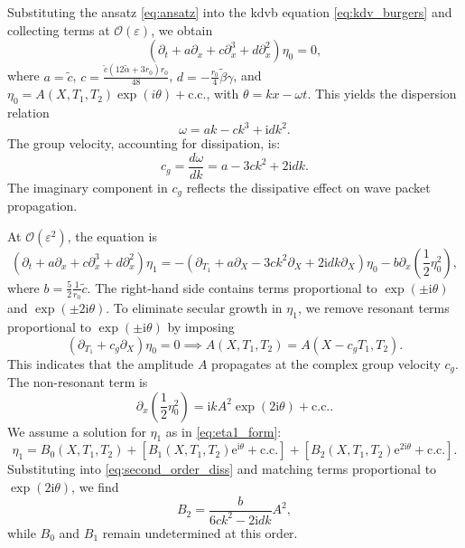 \documentclass[alpha-refs, 12pt]{wiley-article}
\renewcommand{\O}{\mathcal{O}}
\newcommand{\ue}{\mathrm{e}}
\newcommand{\ui}{\mathrm{i}}
\newcommand{\eps}{\varepsilon}
\begin{document}
Substituting the ansatz \eqref{eq:ansatz} into the \acrshort{kdvb} equation \eqref{eq:kdv_burgers} and collecting terms at $\O(\eps)$, we obtain
\begin{equation}\label{eq:leading_order_diss}
  \left( \partial_t + a \partial_x + c \partial_x^3 + d \partial_x^2 \right) \eta_0 = 0,
\end{equation}
where $a = \tilde{c}$, $c = \frac{\tilde{c} (12 \tilde{\alpha} + 3 r_0) r_0}{48}$, $d = -\frac{r_0}{4} \tilde{\beta} \gamma$, and $\eta_0 = A(X, T_1, T_2) \exp(i \theta) + \text{c.c.}$, with $\theta = k x - \omega t$. This yields the dispersion relation
\begin{equation}\label{eq:dispersion_diss}
  \omega = a k - c k^3 + \ui d k^2.
\end{equation}
The group velocity, accounting for dissipation, is:
\begin{equation}\label{eq:group_velocity_diss}
  c_g = \frac{d \omega}{d k} = a - 3 c k^2 + 2 \ui d k.
\end{equation}
The imaginary component in $c_g$ reflects the dissipative effect on wave packet propagation.

At $\O(\eps^2)$, the equation is
\begin{equation}\label{eq:second_order_diss}
  \left( \partial_t + a \partial_x + c \partial_x^3 + d \partial_x^2 \right) \eta_1 = - \left( \partial_{T_1} + a \partial_X - 3 c k^2 \partial_X + 2 \ui d k \partial_X \right) \eta_0 - b \partial_x \left( \frac{1}{2} \eta_0^2 \right),
\end{equation}
where $b = \frac{5}{2} \frac{1}{r_0} \tilde{c}$. The right-hand side contains terms proportional to $\exp(\pm \ui \theta)$ and $\exp(\pm 2 \ui \theta)$. To eliminate secular growth in $\eta_1$, we remove resonant terms proportional to $\exp(\pm \ui \theta)$ by imposing
\begin{equation}\label{eq:secular_elimination_diss}
  \left( \partial_{T_1} + c_g \partial_X \right) \eta_0 = 0 \implies A(X, T_1, T_2) = A(X - c_g T_1, T_2).
\end{equation}
This indicates that the amplitude $A$ propagates at the complex group velocity $c_g$. The non-resonant term is
\[
\partial_x \left( \frac{1}{2} \eta_0^2 \right) = \ui k A^2 \exp(2 \ui \theta) + \text{c.c.}.
\]
We assume a solution for $\eta_1$ as in \eqref{eq:eta1_form}:
\[
\eta_1 = B_0(X, T_1, T_2) + \left[ B_1(X, T_1, T_2) \ue^{\ui \theta} + \text{c.c.} \right] + \left[ B_2(X, T_1, T_2) \ue^{2 \ui \theta} + \text{c.c.} \right].
\]
Substituting into \eqref{eq:second_order_diss} and matching terms proportional to $\exp(2 \ui \theta)$, we find
\begin{equation}
\label{eq:B2_solution_diss}
B_2 = \frac{b}{6 c k^2 - 2 \ui d k} A^2,
\end{equation}
while $B_0$ and $B_1$ remain undetermined at this order.
\end{document}
